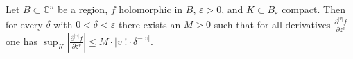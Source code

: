 Let $B \subset \mathbb{C}^n$ be a region, $f$ holomorphic in $B$, $\varepsilon > 0$, and $K \subset B_\varepsilon$ compact. Then for every $\delta$ with $0 < \delta < \varepsilon$ there exists an $M > 0$ such that for all derivatives $\frac{\partial^{|v|} f}{\partial z^v}$ one has $\sup_K |\frac{\partial^{|v|} f}{\partial z^v}| \leqslant M \cdot |v|! \cdot \delta^{-|v|}$.
